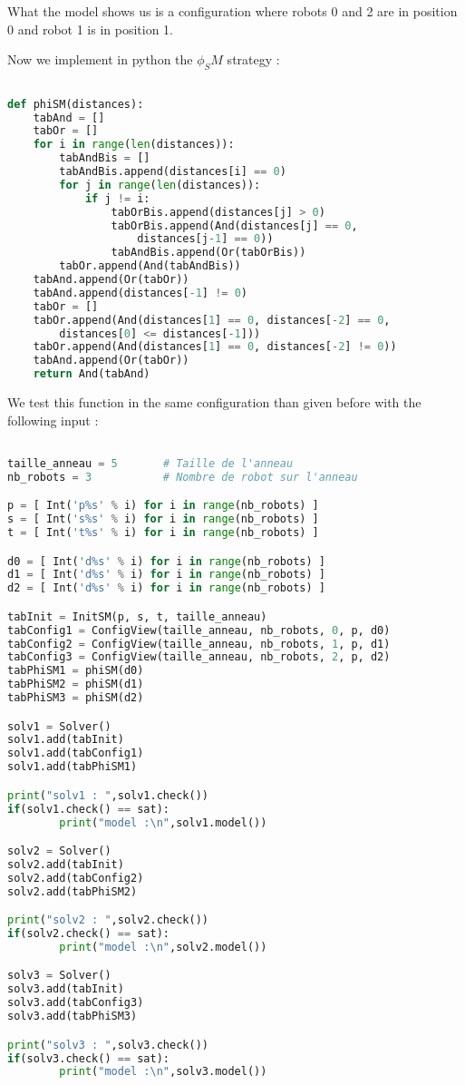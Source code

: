 \documentclass{article}
\begin{document}
What the model shows us is a configuration where robots 0 and 2 are in position 0 and robot 1 is in position 1.

Now we implement in python the $\phi_SM$ strategy :

\begin{lstlisting}[language=Python]

def phiSM(distances):
    tabAnd = []
    tabOr = []
    for i in range(len(distances)):
        tabAndBis = []
        tabAndBis.append(distances[i] == 0)
        for j in range(len(distances)):
            if j != i:
                tabOrBis.append(distances[j] > 0)
                tabOrBis.append(And(distances[j] == 0,
                    distances[j-1] == 0))
                tabAndBis.append(Or(tabOrBis))
        tabOr.append(And(tabAndBis))
    tabAnd.append(Or(tabOr))
    tabAnd.append(distances[-1] != 0)
    tabOr = []
    tabOr.append(And(distances[1] == 0, distances[-2] == 0,
        distances[0] <= distances[-1]))
    tabOr.append(And(distances[1] == 0, distances[-2] != 0))
    tabAnd.append(Or(tabOr))
    return And(tabAnd)
\end{lstlisting}

We test this function in the same configuration than given before with the following input :

\begin{lstlisting}[language=Python]

taille_anneau = 5       # Taille de l'anneau 
nb_robots = 3           # Nombre de robot sur l'anneau

p = [ Int('p%s' % i) for i in range(nb_robots) ]
s = [ Int('s%s' % i) for i in range(nb_robots) ]
t = [ Int('t%s' % i) for i in range(nb_robots) ]

d0 = [ Int('d%s' % i) for i in range(nb_robots) ]
d1 = [ Int('d%s' % i) for i in range(nb_robots) ]
d2 = [ Int('d%s' % i) for i in range(nb_robots) ]

tabInit = InitSM(p, s, t, taille_anneau)
tabConfig1 = ConfigView(taille_anneau, nb_robots, 0, p, d0)
tabConfig2 = ConfigView(taille_anneau, nb_robots, 1, p, d1)
tabConfig3 = ConfigView(taille_anneau, nb_robots, 2, p, d2)
tabPhiSM1 = phiSM(d0)
tabPhiSM2 = phiSM(d1)
tabPhiSM3 = phiSM(d2)

solv1 = Solver()
solv1.add(tabInit)
solv1.add(tabConfig1)
solv1.add(tabPhiSM1)

print("solv1 : ",solv1.check())
if(solv1.check() == sat):
        print("model :\n",solv1.model())

solv2 = Solver()
solv2.add(tabInit)
solv2.add(tabConfig2)
solv2.add(tabPhiSM2)

print("solv2 : ",solv2.check())
if(solv2.check() == sat):
        print("model :\n",solv2.model())

solv3 = Solver()
solv3.add(tabInit)
solv3.add(tabConfig3)
solv3.add(tabPhiSM3)

print("solv3 : ",solv3.check())
if(solv3.check() == sat):
        print("model :\n",solv3.model())
\end{lstlisting}
\end{document}
